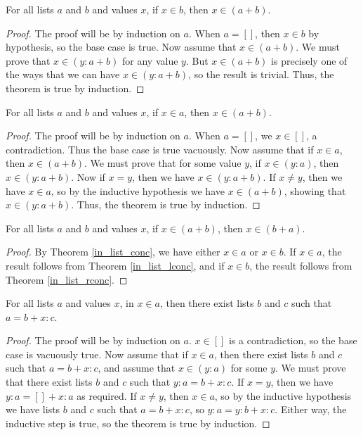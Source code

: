 \documentclass[../../math.tex]{subfiles}
\begin{document}
\begin{theorem} \label{in_list_rconc}
    For all lists $a$ and $b$ and values $x$, if $x \in b$, then $x \in (a +
    b)$.
\end{theorem}
\begin{proof}
    The proof will be by induction on $a$.  When $a = []$, then $x \in b$ by
    hypothesis, so the base case is true.  Now assume that $x \in (a + b)$.  We
    must prove that $x \in (y : a + b)$ for any value $y$.  But $x \in (a + b)$
    is precisely one of the ways that we can have $x \in (y : a + b)$, so the
    result is trivial.  Thus, the theorem is true by induction.
\end{proof}

\begin{theorem} \label{in_list_lconc}
    For all lists $a$ and $b$ and values $x$, if $x \in a$, then $x \in (a +
    b)$.
\end{theorem}
\begin{proof}
    The proof will be by induction on $a$.  When $a = []$, we $x \in []$, a
    contradiction.  Thus the base case is true vacuously.  Now assume that if $x
    \in a$, then $x \in (a + b)$.  We must prove that for some value $y$, if $x
    \in (y : a)$, then $x \in (y : a + b)$.  Now if $x = y$, then we have $x \in
    (y : a + b)$.  If $x \neq y$, then we have $x \in a$, so by the inductive
    hypothesis we have $x \in (a + b)$, showing that $x \in (y : a + b)$.  Thus,
    the theorem is true by induction.
\end{proof}

\begin{theorem} \label{in_list_comm}
    For all lists $a$ and $b$ and values $x$, if $x \in (a + b)$, then $x \in (b
    + a)$.
\end{theorem}
\begin{proof}
    By Theorem \ref{in_list_conc}, we have either $x \in a$ or $x \in b$.  If $x
    \in a$, the result follows from Theorem \ref{in_list_lconc}, and if $x \in
    b$, the result follows from Theorem \ref{in_list_rconc}.
\end{proof}

\begin{theorem} \label{in_list_split}
    For all lists $a$ and values $x$, in $x \in a$, then there exist lists $b$
    and $c$ such that $a = b + x : c$.
\end{theorem}
\begin{proof}
    The proof will be by induction on $a$.  $x \in []$ is a contradiction, so
    the base case is vacuously true.  Now assume that if $x \in a$, then there
    exist lists $b$ and $c$ such that $a = b + x : c$, and assume that $x \in
    (y : a)$ for some $y$.  We must prove that there exist lists $b$ and $c$
    such that $y : a = b + x : c$.  If $x = y$, then we have $y : a = [] + x :
    a$ as required.  If $x \neq y$, then $x \in a$, so by the inductive
    hypothesis we have lists $b$ and $c$ such that $a = b + x : c$, so $y : a
    = y : b + x : c$.  Either way, the inductive step is true, so the theorem is
    true by induction.
\end{proof}
\end{document}
